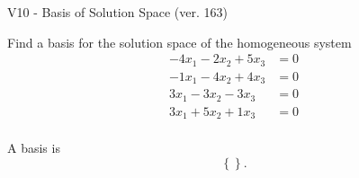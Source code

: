 \begin{exercise}
  \begin{exerciseTitle}V10 - Basis of Solution Space (ver. 163)\end{exerciseTitle}
  \begin{exerciseStatement}
    Find a basis for the solution space of the homogeneous system 
\begin{align*}
 -4 x_ 1 -2 x_ 2 + 5 x_ 3 &= 0  \\ 
  -1 x_ 1 -4 x_ 2 + 4 x_ 3 &= 0  \\ 
  3 x_ 1 -3 x_ 2 -3 x_ 3 &= 0  \\ 
  3 x_ 1 + 5 x_ 2 + 1 x_ 3 &= 0  \\ 
 \end{align*}


 
  \end{exerciseStatement}

  \begin{exerciseAnswer}
   A basis is   
\[\left\{\right\}.\]

  


  \end{exerciseAnswer}
\end{exercise}